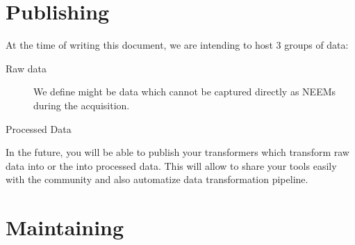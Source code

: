 \section{Publishing}
At the time of writing this document, we are intending to host 3 groups of data:
\begin{description}
	\item[Raw data]
		We define might be data which cannot be captured directly as NEEMs during the acquisition.
	\item[\neems] 
	\item[Processed Data]
\end{description}

In the future, you will be able to publish your transformers which transform raw data into \neems or the \neems into processed data.
This will allow to share your tools easily with the community and also automatize data transformation pipeline.

\section{Maintaining}

